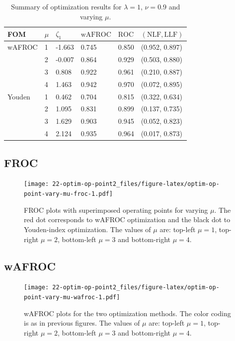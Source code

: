 \documentclass[
]{book}
\begin{document}
\begin{table}

\caption{\label{tab:optim-op-point-table-vary-mu}Summary of optimization results for $\lambda = 1$, $\nu = 0.9$ and varying $\mu$.}
\centering
\fontsize{10}{12}\selectfont
\begin{tabular}[t]{llllll}
\toprule
FOM & $\mu$ & $\zeta_1$ & $\text{wAFROC}$ & $\text{ROC}$ & $\left( \text{NLF}, \text{LLF}\right)$\\
\midrule
wAFROC & 1 & -1.663 & 0.745 & 0.850 & (0.952, 0.897)\\
 & 2 & -0.007 & 0.864 & 0.929 & (0.503, 0.880)\\
 & 3 & 0.808 & 0.922 & 0.961 & (0.210, 0.887)\\
 & 4 & 1.463 & 0.942 & 0.970 & (0.072, 0.895)\\
Youden & 1 & 0.462 & 0.704 & 0.815 & (0.322, 0.634)\\
\addlinespace
 & 2 & 1.095 & 0.831 & 0.899 & (0.137, 0.735)\\
 & 3 & 1.629 & 0.903 & 0.945 & (0.052, 0.823)\\
 & 4 & 2.124 & 0.935 & 0.964 & (0.017, 0.873)\\
\bottomrule
\end{tabular}
\end{table}

\hypertarget{froc-4}{%
\subsection{FROC}\label{froc-4}}

\begin{figure}
\centering
\texttt{[image: 22-optim-op-point2\_files/figure-latex/optim-op-point-vary-mu-froc-1.pdf]}
\caption{\label{fig:optim-op-point-vary-mu-froc}FROC plots with superimposed operating points for varying \(\mu\). The red dot corresponds to wAFROC optimization and the black dot to Youden-index optimization. The values of \(\mu\) are: top-left \(\mu = 1\), top-right \(\mu = 2\), bottom-left \(\mu = 3\) and bottom-right \(\mu = 4\).}
\end{figure}

\hypertarget{wafroc-4}{%
\subsection{wAFROC}\label{wafroc-4}}

\begin{figure}
\centering
\texttt{[image: 22-optim-op-point2\_files/figure-latex/optim-op-point-vary-mu-wafroc-1.pdf]}
\caption{\label{fig:optim-op-point-vary-mu-wafroc}wAFROC plots for the two optimization methods. The color coding is as in previous figures. The values of \(\mu\) are: top-left \(\mu = 1\), top-right \(\mu = 2\), bottom-left \(\mu = 3\) and bottom-right \(\mu = 4\).}
\end{figure}
\end{document}
